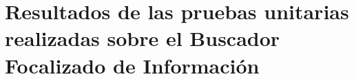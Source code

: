 \chapter{Resultados de las pruebas unitarias realizadas sobre el Buscador Focalizado de Información}\label{chap:apendiceb}

